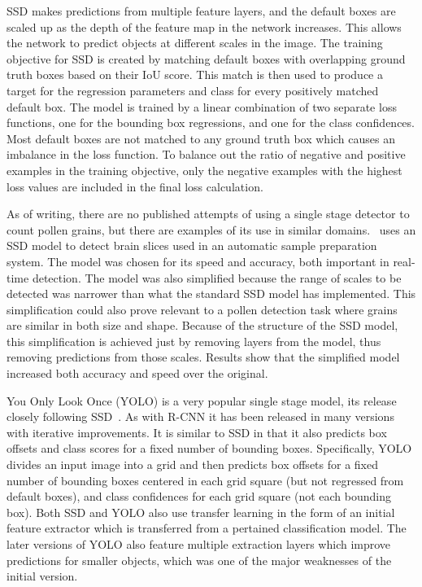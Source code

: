 SSD makes predictions from multiple feature layers, and the default boxes are scaled up as the depth of the feature map in the network increases.
This allows the network to predict objects at different scales in the image.
The training objective for SSD is created by matching default boxes with overlapping ground truth boxes based on their IoU score.
This match is then used to produce a target for the regression parameters and class for every positively matched default box.
The model is trained by a linear combination of two separate loss functions, one for the bounding box regressions, and one for the class confidences.
Most default boxes are not matched to any ground truth box which causes an imbalance in the loss function.
To balance out the ratio of negative and positive examples in the training objective, only the negative examples with the highest loss values are included in the final loss calculation.

As of writing, there are no published attempts of using a single stage detector to count pollen grains, but there are examples of its use in similar domains.\ \cite{liu_brain_2018} uses an SSD model to detect brain slices used in an automatic sample preparation system.
The model was chosen for its speed and accuracy, both important in real-time detection.
The model was also simplified because the range of scales to be detected was narrower than what the standard SSD model has implemented.
This simplification could also prove relevant to a pollen detection task where grains are similar in both size and shape.
Because of the structure of the SSD model, this simplification is achieved just by removing layers from the model, thus removing predictions from those scales.
Results show that the simplified model increased both accuracy and speed over the original.

You Only Look Once (YOLO) is a very popular single stage model, its release closely following SSD\ \parencite{redmon2016look}.
As with R-CNN it has been released in many versions with iterative improvements.
It is similar to SSD in that it also predicts box offsets and class scores for a fixed number of bounding boxes.
Specifically, YOLO divides an input image into a grid and then predicts box offsets for a fixed number of bounding boxes centered in each grid square (but not regressed from default boxes), and class confidences for each grid square (not each bounding box).
Both SSD and YOLO also use transfer learning in the form of an initial feature extractor which is transferred from a pertained classification model.
The later versions of YOLO also feature multiple extraction layers which improve predictions for smaller objects, which was one of the major weaknesses of the initial version.

